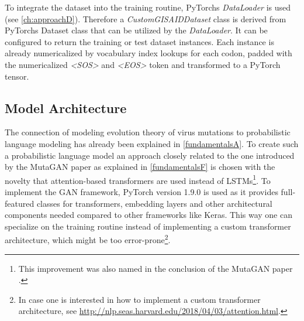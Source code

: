 To integrate the dataset into the training routine, PyTorchs \textit{DataLoader} is used (see \autoref{ch:approachD}). Therefore a \textit{CustomGISAIDDataset} class is derived from PyTorchs Dataset class that can be utilized by the \textit{DataLoader}. It can be configured to return the training or test dataset instances. Each instance is already numericalized by vocabulary index lookups for each codon, padded with the numericalized \textit{<SOS>} and \textit{<EOS>} token and transformed to a PyTorch tensor. 

\subsection{Model Architecture}  \label{ch:approachC}

The connection of modeling evolution theory of virus mutations to probabilistic language modeling has already been explained in \autoref{fundamentalsA}. To create such a probabilistic language model an approach closely related to the one introduced by the MutaGAN paper \cite{Berman2020} as explained in \autoref{fundamentalsF} is chosen with the novelty that attention-based transformers are used instead of \acp{LSTM}\footnote{This improvement was also named in the conclusion of the MutaGAN paper \cite{Berman2020}.}. To implement the \ac{GAN} framework, PyTorch version 1.9.0 is used as it provides full-featured classes for transformers, embedding layers and other architectural components needed compared to other frameworks like Keras. This way one can specialize on the training routine instead of implementing a custom transformer architecture, which might be too error-prone\footnote{In case one is interested in how to implement a custom transformer architecture, see \url{http://nlp.seas.harvard.edu/2018/04/03/attention.html}.}. 

